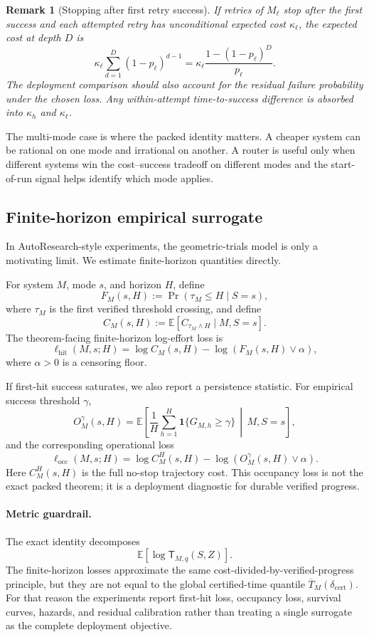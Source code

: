 \documentclass{article}
\newtheorem{remark}{Remark}
\newcommand{\E}{\mathbb{E}}
\newcommand{\one}{\mathbf{1}}
\begin{document}
\begin{remark}[Stopping after first retry success]
If retries of \(M_\ell\) stop after the first success and each attempted retry has
unconditional expected cost \(\kappa_\ell\), the expected cost at depth \(D\) is
\[
    \kappa_\ell
    \sum_{d=1}^{D}(1-p_\ell)^{d-1}
    =
    \kappa_\ell\frac{1-(1-p_\ell)^D}{p_\ell}.
\]
The deployment comparison should also account for the residual failure probability under
the chosen loss.  Any within-attempt time-to-success difference is absorbed into
\(\kappa_h\) and \(\kappa_\ell\).
\end{remark}

The multi-mode case is where the packed identity matters.  A cheaper system can be
rational on one mode and irrational on another.  A router is useful only when different
systems win the cost--success tradeoff on different modes and the start-of-run signal helps
identify which mode applies.

\subsection{Finite-horizon empirical surrogate}

In AutoResearch-style experiments, the geometric-trials model is only a motivating limit.
We estimate finite-horizon quantities directly.

For system \(M\), mode \(s\), and horizon \(H\), define
\[
    F_M(s,H):=\Pr(\tau_M\le H\mid S=s),
\]
where \(\tau_M\) is the first verified threshold crossing, and define
\[
    C_M(s,H):=\E[C_{\tau_M\wedge H}\mid M,S=s].
\]
The theorem-facing finite-horizon log-effort loss is
\[
    \ell_{\mathrm{hit}}(M,s;H)
    =
    \log C_M(s,H)-\log(F_M(s,H)\vee\alpha),
\]
where \(\alpha>0\) is a censoring floor.

If first-hit success saturates, we also report a persistence statistic.  For empirical
success threshold \(\gamma\),
\[
    O_M^\gamma(s,H)
    =
    \E\left[
        \frac1H\sum_{h=1}^H
        \one\{G_{M,h}\ge\gamma\}
        \,\middle|\,
        M,S=s
    \right],
\]
and the corresponding operational loss
\[
    \ell_{\mathrm{occ}}(M,s;H)
    =
    \log C_M^H(s,H)-\log(O_M^\gamma(s,H)\vee\alpha).
\]
Here \(C_M^H(s,H)\) is the full no-stop trajectory cost.
This occupancy loss is not the exact packed theorem; it is a deployment diagnostic for
durable verified progress.

\paragraph{Metric guardrail.}
The exact identity decomposes
\[
    \E[\log \mathsf T_{M,q}(S,Z)].
\]
The finite-horizon losses approximate the same cost-divided-by-verified-progress principle,
but they are not equal to the global certified-time quantile
\(\overline T_M(\delta_{\mathrm{cert}})\).
For that reason the experiments report first-hit loss, occupancy loss, survival curves,
hazards, and residual calibration rather than treating a single surrogate as the complete
deployment objective.
\end{document}
